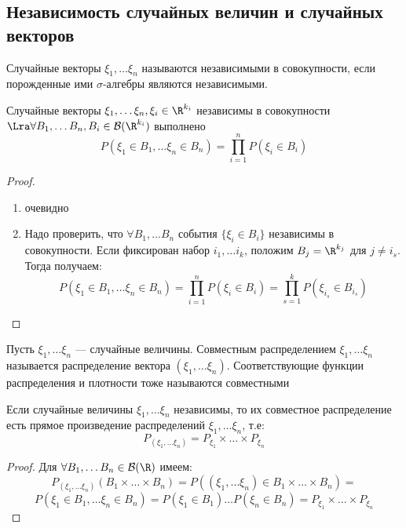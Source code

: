 \subsection{Независимость случайных величин и случайных векторов}
\begin{definition}
    Случайные векторы \(\xi_1, \dots \xi_n\) называются независимыми в совокупности, если порожденные ими \(\sigma\)-алгебры являются независимыми.
\end{definition}

\begin{proposition}
    Случайные векторы \(\xi_1, \dots \xi_n, \xi_i \in \R^{k_i}\) независимы в совокупности \(\Lra \forall B_1, \dots B_n, B_i \in \mathcal{B}(\R^{k_i})\) выполнено
    \[P(\xi_1 \in B_1, \dots \xi_n \in B_n) = \prod_{i = 1}^n P(\xi_i \in B_i)\]
\end{proposition}
\begin{proof}
    \begin{enumerate}
        \item[\(\Ra\)] очевидно
        \item[\(\La\)] Надо проверить, что \(\forall B_1, \dots B_n\) события \(\{\xi_i \in B_i\}\) независимы в совокупности. Если фиксирован набор \(i_1, \dots i_k\), положим \(B_j = \R^{k_j}\) для \(j \ne i_s\). Тогда получаем:
        \[P(\xi_1 \in B_1, \dots \xi_n \in B_n) = \prod_{i = 1}^n P(\xi_i \in B_i) = \prod_{s = 1}^k P(\xi_{i_s} \in B_{i_s})\]
    \end{enumerate}
\end{proof}

\begin{definition}
    Пусть \(\xi_1, \dots \xi_n\) --- случайные величины. Совместным распределением \(\xi_1, \dots \xi_n\) называется распределение вектора \((\xi_1, \dots \xi_n)\). Соответствующие функции распределения и плотности тоже называются совместными
\end{definition}

\begin{proposition}
    Если случайные величины \(\xi_1, \dots \xi_n\) независимы, то их совместное распределение есть прямое произведение распределений \(\xi_1, \dots \xi_n\), т.е:
    \[P_{(\xi_1, \dots \xi_n)} = P_{\xi_1} \times \dots \times P_{\xi_n}\]
\end{proposition}
\begin{proof}
    Для \(\forall B_1, \dots B_n \in \mathcal{B}(\R)\) имеем:
    \[P_{(\xi_1, \dots \xi_n)}(B_1 \times \dots \times B_n) = P((\xi_1, \dots \xi_n) \in B_1 \times \dots \times B_n) = \]
    \[P(\xi_1 \in B_1, \dots \xi_n \in B_n) = P(\xi_1 \in B_1)\dots P(\xi_n \in B_n) = P_{\xi_1} \times \dots \times P_{\xi_n}\]
\end{proof}

